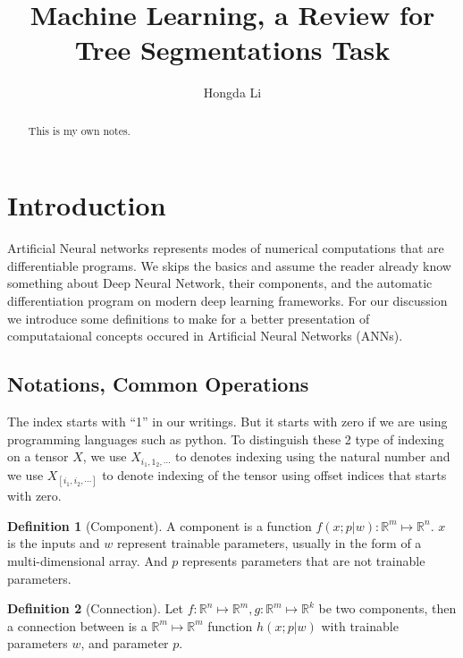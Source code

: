 \documentclass[]{article}
\title{Machine Learning, a Review for Tree Segmentations Task}
\author{Hongda Li}
\theoremstyle{definition}
\newtheorem{definition}{Definition}
\numberwithin{equation}{subsection}
\begin{document}
\maketitle

\begin{abstract}
    This is my own notes. 
\end{abstract}


\section{Introduction}
    Artificial Neural networks represents modes of numerical computations that are differentiable programs. 
    We skips the basics and assume the reader already know something about Deep Neural Network, their components, and the automatic differentiation program on modern deep learning frameworks. 
    For our discussion we introduce some definitions to make for a better presentation of computataional concepts occured in Artificial Neural Networks (ANNs). 
    \par
    \subsection{Notations, Common Operations}
        The index starts with ``1'' in our writings. 
        But it starts with zero if we are using programming languages such as python. 
        To distinguish these 2 type of indexing on a tensor $X$, we use $X_{i_1, 1_2, \cdots}$ to denotes indexing using the natural number and we use $X_{[i_1, i_2, \cdots]}$ to denote indexing of the tensor using offset indices that starts with zero. 
    \begin{definition}[Component]
        A component is a function $f(x; p|w): \mathbb R^m \mapsto \mathbb R^n$. 
        $x$ is the inputs and $w$ represent trainable parameters, usually in the form of a multi-dimensional array. 
        And $p$ represents parameters that are not trainable parameters. 
        
    \end{definition}
    \begin{definition}[Connection]
        Let $f:\mathbb R^n \mapsto \mathbb R^m, g: \mathbb R^m \mapsto \mathbb R^k$ be two components, then a connection between is a $\mathbb R^m \mapsto \mathbb R^m$ function $h(x; p | w)$ with trainable parameters $w$, and parameter $p$. 
    \end{definition}
\end{document}
